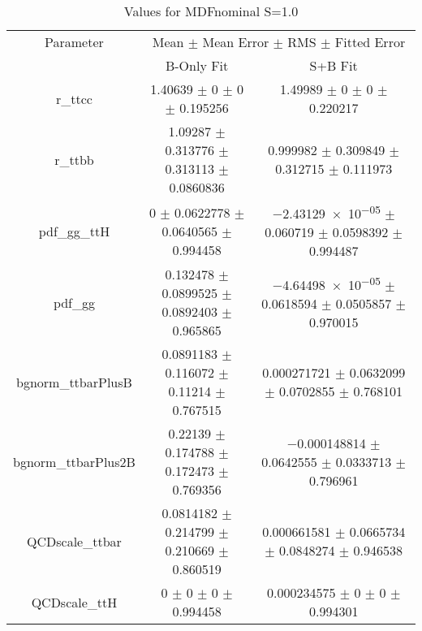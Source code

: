 \begin{table}
\centering
\caption{Values for MDFnominal S=1.0}
\begin{tabular}{ccc}
\toprule
Parameter & \multicolumn{2}{c}{Mean $\pm$ Mean Error $\pm$ RMS $\pm$ Fitted Error}\\
 & B-Only Fit & S+B Fit\\
\midrule
r\_ttcc & \num{1.40639} $\pm$ \num{0} $\pm$ \num{0} $\pm$ \num{0.195256} & \num{1.49989} $\pm$ \num{0} $\pm$ \num{0} $\pm$ \num{0.220217}\\
r\_ttbb & \num{1.09287} $\pm$ \num{0.313776} $\pm$ \num{0.313113} $\pm$ \num{0.0860836} & \num{0.999982} $\pm$ \num{0.309849} $\pm$ \num{0.312715} $\pm$ \num{0.111973}\\
pdf\_gg\_ttH & \num{0} $\pm$ \num{0.0622778} $\pm$ \num{0.0640565} $\pm$ \num{0.994458} & \num{-2.43129e-05} $\pm$ \num{0.060719} $\pm$ \num{0.0598392} $\pm$ \num{0.994487}\\
pdf\_gg & \num{0.132478} $\pm$ \num{0.0899525} $\pm$ \num{0.0892403} $\pm$ \num{0.965865} & \num{-4.64498e-05} $\pm$ \num{0.0618594} $\pm$ \num{0.0505857} $\pm$ \num{0.970015}\\
bgnorm\_ttbarPlusB & \num{0.0891183} $\pm$ \num{0.116072} $\pm$ \num{0.11214} $\pm$ \num{0.767515} & \num{0.000271721} $\pm$ \num{0.0632099} $\pm$ \num{0.0702855} $\pm$ \num{0.768101}\\
bgnorm\_ttbarPlus2B & \num{0.22139} $\pm$ \num{0.174788} $\pm$ \num{0.172473} $\pm$ \num{0.769356} & \num{-0.000148814} $\pm$ \num{0.0642555} $\pm$ \num{0.0333713} $\pm$ \num{0.796961}\\
QCDscale\_ttbar & \num{0.0814182} $\pm$ \num{0.214799} $\pm$ \num{0.210669} $\pm$ \num{0.860519} & \num{0.000661581} $\pm$ \num{0.0665734} $\pm$ \num{0.0848274} $\pm$ \num{0.946538}\\
QCDscale\_ttH & \num{0} $\pm$ \num{0} $\pm$ \num{0} $\pm$ \num{0.994458} & \num{0.000234575} $\pm$ \num{0} $\pm$ \num{0} $\pm$ \num{0.994301}\\
\bottomrule
\end{tabular}
\end{table}